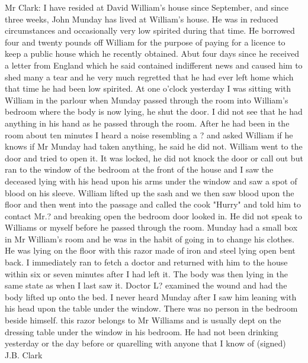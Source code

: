 Mr Clark: I have resided at David William's house since September, and since three weeks, John Munday has lived at William's house. He was in reduced circumstances and occasionally very low spirited during that time. He borrowed four and twenty pounds off William for the purpose of paying for a licence to keep a public house which he recently obtained. Abut four days since he received a letter from England which he said contained indifferent news and caused him to shed many a tear and he very much regretted that he had ever left home which that time he had been low spirited. At one o'clock yesterday I was sitting with William in the parlour when Munday passed through the room into William's bedroom where the body is now lying, he shut the door. I did not see that he had anything in his hand as he passed through the room. After he had been in the room about ten minutes I heard a noise resembling a ? and asked William if he knows if Mr Munday had taken anything, he said he did not. William went to the door and tried to open it. It was locked, he did not knock the door or call out but ran to the window of the bedroom at the front of the house and I saw the deceased lying with his head upon his arms under the window and saw a spot of blood on his sleeve. William lifted up the sash and we then saw blood upon the floor and then went into the passage and called the cook "Hurry" and told him to contact Mr.? and breaking open the bedroom door looked in. He did not speak to Williams or myself before he passed through the room. Munday had a small box in Mr William's room and he was in the habit of going in to change his clothes. He was lying on the floor with this razor made of iron and steel lying open bent back. I immediately ran to fetch a doctor and returned with him to the house within six or seven minutes after I had left it. The body was then lying in the same state as when I last saw it. Doctor L? examined the wound and had the body lifted up onto the bed. I never heard Munday after I saw him leaning with his head upon the table under the window. There was no person in the bedroom beside himself. this razor belongs to Mr Williams and is usually dept on the dressing table under the window in his bedroom. He had not been drinking yesterday or the day before or quarelling with anyone that I know of (signed) J.B. Clark

